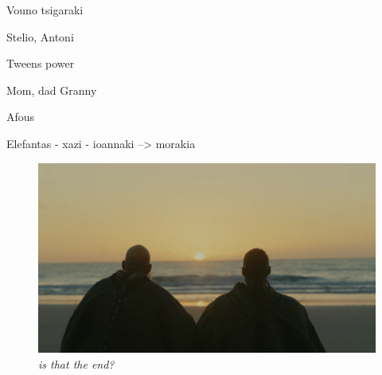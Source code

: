 \documentclass[master=elt, cleveref, autoref, masteroption=eg]{kulemt}
\begin{document}
\begin{preface}
   Vouno tsigaraki 

   Stelio, Antoni

   Tweens power 

   Mom, dad 
   Granny 


   Afous 


   Elefantas - xazi - ioannaki --> morakia  
  

   \begin{figure}[h]
      \centering
      \includegraphics[width=\columnwidth]{figures/the_end.png}
      \caption*{
         \textit{is that the end?}
      }
   \end{figure}



\end{preface}

\tableofcontents
\newpage
\end{document}
